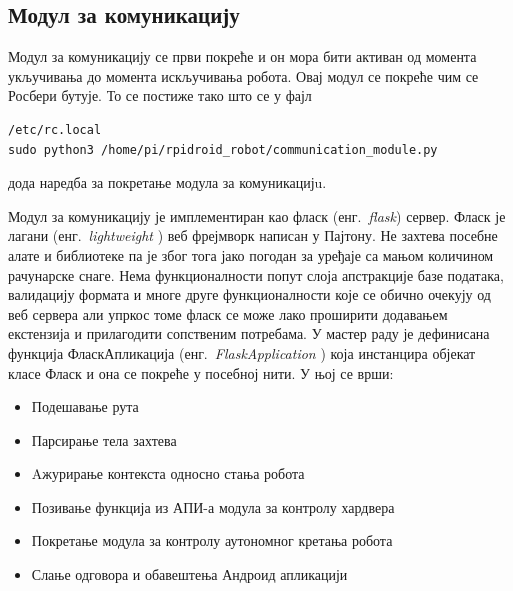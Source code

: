 \documentclass[12pt,oneside]{memoir}
\theoremstyle{remark}
\begin{document}
\subsection{Модул за комуникацију}
Модул за комуникацију се први покреће и он мора бити активан од момента укључивања до момента искључивања робота. Овај модул се покреће чим се Росбери бутује. То се постиже тако што се у фајл 
\begin{lstlisting}
/etc/rc.local
sudo python3 /home/pi/rpidroid_robot/communication_module.py
\end{lstlisting}
дода наредба за покретање модула за комуникацијu.

Модул за комуникацију је имплементиран као фласк (енг.~{\em flask}) сервер. Фласк је лагани  (енг.~{\em light\-weight }) веб фрејмворк написан у Пајтону. Не захтева посебне алате и библиотеке па је због тога јако погодан за уређаје са мањом количином рачунарске снаге. Нема функционалности попут слоја апстракције базе података, валидацију формата и многе друге функционалности које се обично очекују од веб сервера али упркос томе фласк се може лако проширити додавањем екстензија и прилагодити сопственим потребама.
У мастер раду је дефинисана функција ФласкАпликација (енг.~{\em FlaskApplication }) која инстанцира објекат класе Фласк и она се покреће у посебној нити.  У њој се врши:
\begin{itemize}
\item Подешавање рута
\item Парсирање тела захтева 
\item Aжурирање контекста односно стања робота
\item Позивање функција из АПИ-а модула за контролу хардвера
\item Покретање модула за контролу аутономног кретања робота
\item Слање одговора и обавештења Андроид апликацији
\end{itemize}
\end{document}

